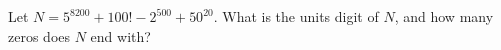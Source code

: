 Let $N=5^{8200}+100!-2^{500}+50^{20}$. What is the units digit of $N$, and how many zeros does $N$ end with?
